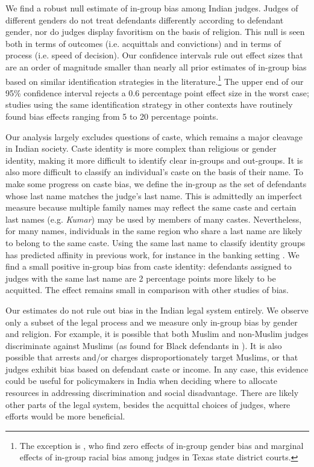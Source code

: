 \documentclass[12pt,english]{article}
\begin{document}
We find a robust null estimate of in-group bias among Indian judges. Judges of different genders do not treat defendants differently according to defendant gender, nor do judges display favoritism on the basis of religion. This null is seen both in terms of outcomes (i.e. acquittals and convictions) and in terms of process (i.e. speed of decision). Our confidence intervals rule out effect sizes that are an order of magnitude smaller than nearly all prior estimates of in-group bias based on similar identification strategies in the literature.\footnote{The exception is \cite{lim2016judges}, who find zero effects of in-group gender bias and marginal effects of in-group racial bias among judges in Texas state district courts.} The upper end of our 95\% confidence interval rejects a 0.6 percentage point effect size in the worst case; studies using the same identification strategy in other contexts have routinely found bias effects ranging from 5 to 20 percentage points.

Our analysis largely excludes questions of caste, which remains a major cleavage in Indian society. Caste identity is more complex than religious or gender identity, making it more difficult to identify clear in-groups and out-groups. It is also more difficult to classify an individual's caste on the basis of their name. To make some progress on caste bias, we define the in-group as the set of defendants whose last name matches the judge's last name. This is admittedly an imperfect measure because multiple family names may reflect the same caste and certain last names (e.g. \textit{Kumar}) may be used by members of many castes. Nevertheless, for many names, individuals in the same region who share a last name are likely to belong to the same caste. Using the same last name to classify identity groups has predicted affinity in previous work, for instance in the banking setting \citep{fisman2017cultural}. We find a small positive in-group bias from caste identity: defendants assigned to judges with the same last name are 2 percentage points more likely to be acquitted. The effect remains small in comparison with other studies of bias.

Our estimates do not rule out bias in the Indian legal system entirely. We observe only a subset of the legal process and we measure only in-group bias by gender and religion. For example, it is possible that both Muslim and non-Muslim judges discriminate against Muslims (as found for Black defendants in \citet{arnold2018racial}). It is also possible that arrests and/or charges disproportionately target Muslims,  or that judges exhibit bias based on defendant caste or income. In any case, this evidence could be useful for policymakers in India when deciding where to allocate resources in addressing discrimination and social disadvantage. There are likely other parts of the legal system, besides the acquittal choices of judges, where efforts would be more beneficial. 
\end{document}
